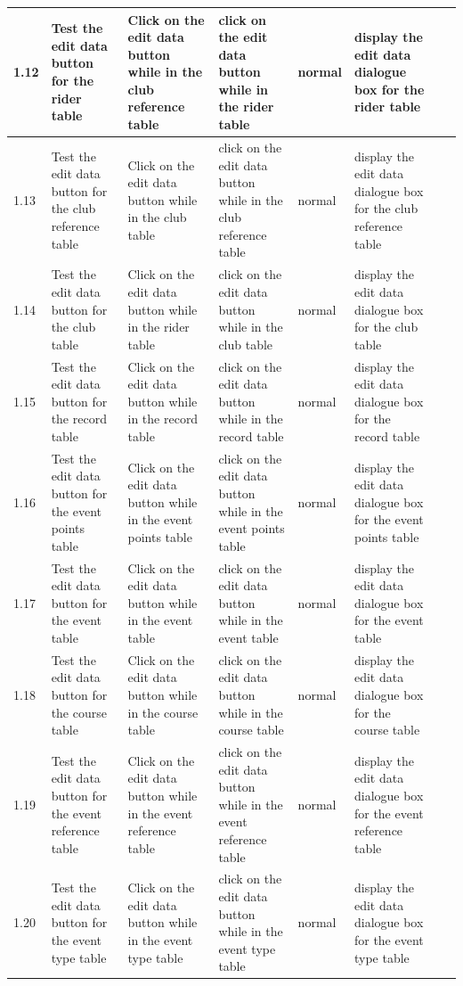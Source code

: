 \begin{landscape}
\begin{center}
\begin{longtable}{|p{1.5cm}|p{2.5cm}|p{2.5cm}|p{2cm}|p{2cm}|p{2cm}|p{2cm}|p{2cm}|}
        
        1.12 & Test the edit data button for the rider table & Click on the edit data button while in the club reference table & click on the edit data button while in the rider table & normal & display the edit data dialogue box for the rider table & & \\ \hline
        1.13 & Test the edit data button for the club reference table & Click on the edit data button while in the club table & click on the edit data button while in the club reference table & normal & display the edit data dialogue box for the club reference table & & \\ \hline
        1.14 & Test the edit data button for the club  table & Click on the edit data button while in the rider table & click on the edit data button while in the club table & normal & display the edit data dialogue box for the club  table & & \\ \hline
        1.15 & Test the edit data button for the record  table & Click on the edit data button while in the record table & click on the edit data button while in the record table & normal & display the edit data dialogue box for the record  table & & \\ \hline
        1.16 & Test the edit data button for the event points  table & Click on the edit data button while in the event points table & click on the edit data button while in the event points table & normal & display the edit data dialogue box for the event points  table & & \\ \hline
        1.17 & Test the edit data button for the event  table & Click on the edit data button while in the event table & click on the edit data button while in the event table & normal & display the edit data dialogue box for the event  table & & \\ \hline
        1.18 & Test the edit data button for the course  table & Click on the edit data button while in the course table & click on the edit data button while in the course table & normal & display the edit data dialogue box for the course  table & & \\ \hline
        1.19 & Test the edit data button for the event reference  table & Click on the edit data button while in the event reference table & click on the edit data button while in the event reference table & normal & display the edit data dialogue box for the event reference  table & & \\ \hline
        1.20 & Test the edit data button for the event type  table & Click on the edit data button while in the event type table & click on the edit data button while in the event type table & normal & display the edit data dialogue box for the event type  table & & \\ \hline
        

\end{longtable}
\end{center}
\end{landscape}
